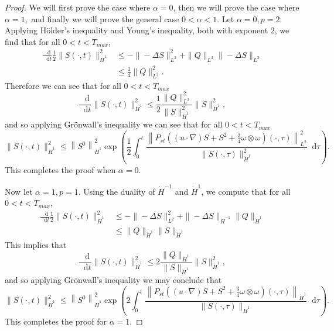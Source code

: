 \documentclass[11pt]{article}
\theoremstyle{plain}
\theoremstyle{remark}
\numberwithin{equation}{section}
\newcommand{\diff}{\mathop{}\!\mathrm{d}}
\begin{document}
\begin{proof}
We will first prove the case where $\alpha=0$, then we will prove the case where $\alpha=1,$ and finally we will prove the general case $0<\alpha<1.$
Let $\alpha=0, p=2$.
Applying H\"older's inequality and Young's inequality, both with exponent $2$, we find that
for all $0<t<T_{max}$,
\begin{align}
    \frac{\diff}{\diff t}
    \frac{1}{2} \|S(\cdot,t)\|_{\dot{H}^1}^2
    &\leq
    -\|-\Delta S\|_{L^2}^2
    +\|Q\|_{L^2}\|-\Delta S\|_{L^2} \\
    &\leq
    \frac{1}{4}\|Q\|_{L^2}^2.
\end{align}
Therefore we can see that
for all $0<t<T_{max}$
\begin{equation}
    \frac{\diff}{\diff t}
    \|S(\cdot,t)\|_{\dot{H}^1}^2
    \leq
    \frac{1}{2} \frac{\|Q\|_{L^2}^2}{\|S\|_{\dot{H}^1}^2}
    \|S\|_{\dot{H}^1}^2,
\end{equation}
and so applying Gr\"onwall's inequality we can see that
for all $0<t<T_{max}$
\begin{equation}
    \|S(\cdot,t)\|_{\dot{H}^1}^2
    \leq
    \left\|S^0 \right\|_{\dot{H}^1}^2
    \exp \left( \frac{1}{2} \int_0^t
    \frac{\left\|P_{st}\left((u\cdot\nabla)S +S^2+\frac{3}{4}\omega\otimes\omega\right)
    (\cdot,\tau)\right\|_{L^2}^2}
    {\|S(\cdot,\tau)\|_{\dot{H}^1}^2} 
    \diff\tau \right).
\end{equation}
This completes the proof when $\alpha=0$.

Now let $\alpha=1, p=1$.
Using the duality of $\dot{H}^{-1}$ and $\dot{H}^1$, 
we compute that for all $0<t<T_{max}$,
\begin{align}
    \frac{\diff}{\diff t}
    \frac{1}{2} \|S(\cdot,t)\|_{\dot{H}^1}^2
    &\leq
    -\|-\Delta S\|_{L^2}^2
    + \|-\Delta S\|_{\dot{H}^{-1}}\|Q\|_{\dot{H}^1} \\
    &\leq
    \|Q\|_{\dot{H}^1} \|S\|_{\dot{H}^1}
\end{align}
This implies that
\begin{equation}
    \frac{\diff}{\diff t}
    \|S(\cdot,t)\|_{\dot{H}^1}^2
    \leq
    2 \frac{\|Q\|_{\dot{H}^1}}{\|S\|_{\dot{H}^1}}
    \|S\|_{\dot{H}^1}^2,
\end{equation}
and so applying Gr\"onwall's inequality we may conclude that
\begin{equation}
    \|S(\cdot,t)\|_{\dot{H}^1}^2
    \leq
    \left\|S^0 \right\|_{\dot{H}^1}^2
    \exp \left( 2\int_0^t
    \frac{\left\|P_{st}\left((u\cdot\nabla)S +S^2+\frac{3}{4}\omega\otimes\omega\right)
    (\cdot,\tau)\right\|_{\dot{H}^1}}
    {\|S(\cdot,\tau)\|_{\dot{H}^1}} 
    \diff\tau \right).
\end{equation}
This completes the proof for $\alpha=1$.


\end{proof}
\end{document}
